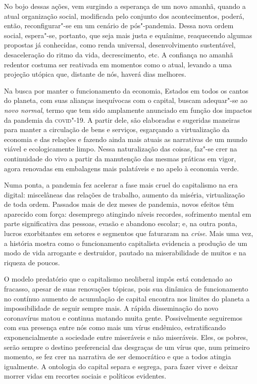 No bojo dessas ações, vem surgindo a esperança de um novo amanhã, quando
a atual organização social, modificada pelo conjunto dos acontecimentos,
poderá, então, reconfigurar"-se em um cenário de pós"-pandemia. Dessa nova
ordem social, espera"-se, portanto, que seja mais justa e equânime,
reaquecendo algumas propostas já conhecidas, como renda universal,
desenvolvimento sustentável, desaceleração do ritmo da vida,
decrescimento, etc. A confiança no amanhã redentor costuma ser reativada
em momentos como o atual, levando a uma projeção utópica que, distante
de nós, haverá dias melhores.

Na busca por manter o funcionamento da economia, Estados em todos os
cantos do planeta, com suas alianças inequívocas com o capital, buscam
adequar"-se ao \emph{novo normal}, termo que tem sido amplamente
anunciado em função dos impactos da pandemia da \textsc{covid}"-19. A partir dele,
são elaboradas e sugeridas maneiras para manter a circulação de bens e
serviços, esgarçando a virtualização da economia e das relações e
fazendo ainda mais atuais as narrativas de um mundo viável e
ecologicamente limpo. Nessa naturalização das coisas, faz"-se crer na
continuidade do vivo a partir da manutenção das mesmas práticas em
vigor, agora renovadas em embalagens mais palatáveis e no apelo à
economia verde.

Numa ponta, a pandemia fez acelerar a fase mais cruel do capitalismo na
era digital: miscelâneas das relações de trabalho, aumento da miséria,
virtualização de toda ordem. Passados mais de dez meses de pandemia,
novos efeitos têm aparecido com força: desemprego atingindo níveis
recordes, sofrimento mental em parte significativa das pessoas, evasão e
abandono escolar; e, na outra ponta, lucros exorbitantes em setores e
segmentos que faturaram na \emph{crise}. Mais uma vez, a história mostra
como o funcionamento capitalista evidencia a produção de um modo de vida
arrogante e destruidor, pautado na miserabilidade de muitos e na riqueza
de poucos.

O modelo predatório que o capitalismo neoliberal impôs está condenado ao
fracasso, apesar de suas renovações tópicas, pois sua dinâmica de
funcionamento no contínuo aumento de acumulação de capital encontra nos
limites do planeta a impossibilidade de seguir sempre mais. A rápida
disseminação do novo coronavírus matou e continua matando muita gente.
Possivelmente seguiremos com sua presença entre nós como mais um vírus
endêmico, estratificando exponencialmente a sociedade entre miseráveis e
não miseráveis. Eles, os pobres, serão sempre o destino preferencial das
desgraças de um vírus que, num primeiro momento, se fez crer na
narrativa de ser democrático e que a todos atingia igualmente. A
ontologia do capital separa e segrega, para fazer viver e deixar morrer
vidas em recortes sociais e políticos evidentes.


